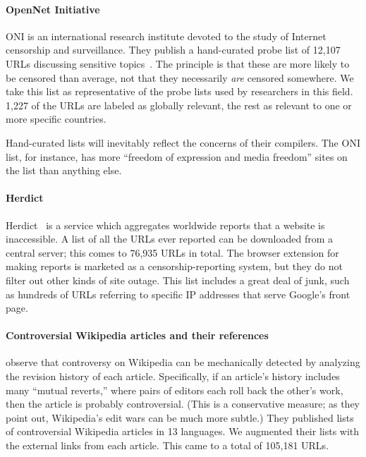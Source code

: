 \paragraph{OpenNet Initiative}\label{s:lists-oni}
ONI is an international research institute devoted to the study of
Internet censorship and surveillance.  They publish a hand-curated
probe list of 12,107 URLs discussing sensitive
topics~\cite{oni.nd.testlists}.  The principle is that these are more
likely to be censored than average, not that they necessarily
\emph{are} censored somewhere. We take this list as representative of
the probe lists used by researchers in this field.  1,227 of the URLs
are labeled as globally relevant, the rest as relevant to one or more
specific countries.

Hand-curated lists will inevitably reflect the concerns of their
compilers.  The ONI list, for instance, has more “freedom of expression
and media freedom” sites on the list than anything else.

\paragraph{Herdict}\label{s:lists-herdict}
Herdict~\cite{berkman.nd.herdict} is a service which aggregates
worldwide reports that a website is inaccessible.  A list of all the
URLs ever reported can be downloaded from a central server; this comes
to 76,935 URLs in total.  The browser extension for making reports is
marketed as a censorship-reporting system, but they do not filter out
other kinds of site outage.  This list includes a great deal of junk,
such as hundreds of URLs referring to specific IP addresses that serve
Google's front page.

\paragraph{Controversial Wikipedia articles and their references}
\label{s:lists-wikipedia}
\Textcite{yasseri.2014.wikipedia} observe that controversy on
Wikipedia can be mechanically detected by analyzing the revision
history of each article. Specifically, if an article's history
includes many “mutual reverts,” where pairs of editors each roll back
the other's work, then the article is probably controversial.  (This
is a conservative measure; as they point out, Wikipedia's edit wars
can be much more subtle.)  They published lists of controversial
Wikipedia articles in 13 languages.  We augmented their lists with the
external links from each article.  This came to a total of 105,181
URLs.

